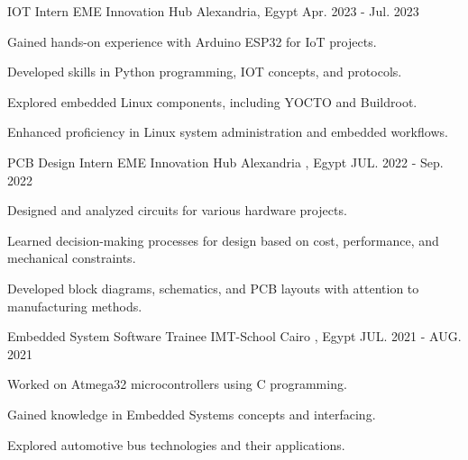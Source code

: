\begin{cventries}
{    }
  \cventry
    {\normalsize IOT Intern} %
    {\newline \Large EME Innovation Hub} %
    {\normalsize Alexandria, Egypt} %
    {\normalsize Apr. 2023 - Jul. 2023} %
    {
      \begin{cvitems} %
        \item {\normalsize Gained hands-on experience with Arduino ESP32 for IoT projects.}
        \item {\normalsize Developed skills in Python programming, IOT concepts, and protocols.}
        \item {\normalsize Explored embedded Linux components, including YOCTO and Buildroot.}
        \item {\normalsize Enhanced proficiency in Linux system administration and embedded workflows.}
      \end{cvitems}
    }
  \cventry
    {\normalsize PCB Design Intern} %
    {\newline \Large EME Innovation Hub} %
    {\normalsize Alexandria , Egypt} %
    {\normalsize JUL. 2022 - Sep. 2022} %
    {
      \begin{cvitems} %
        \item{\normalsize Designed and analyzed circuits for various hardware projects.}
        \item{\normalsize Learned decision-making processes for design based on cost, performance, and mechanical constraints.}
        \item{\normalsize Developed block diagrams, schematics, and PCB layouts with attention to manufacturing methods.}
      \end{cvitems}
    }
\cventry
{\normalsize Embedded System Software Trainee} %
{\newline \Large IMT-School} %
{\normalsize Cairo , Egypt} %
{\normalsize JUL. 2021 - AUG. 2021} %
{
  \begin{cvitems} %
    \item{\normalsize Worked on Atmega32 microcontrollers using C programming.}
    \item{\normalsize Gained knowledge in Embedded Systems concepts and interfacing.}
    \item{\normalsize Explored automotive bus technologies and their applications.\newline}
  \end{cvitems}
}
\end{cventries}
